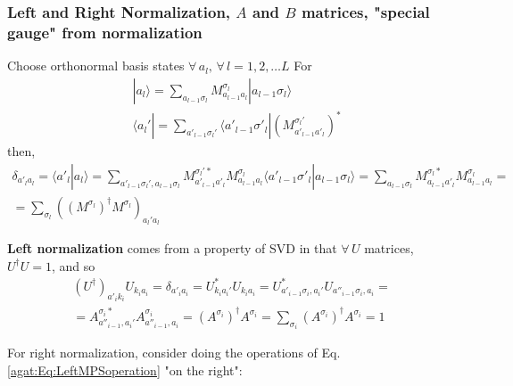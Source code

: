 \subsubsection{Left and Right Normalization, $A$ and $B$ matrices, "special gauge" from normalization}

Choose orthonormal basis states $\forall \, a_l, \, \forall \, l = 1, 2, \dots L$
For
\[
\begin{aligned}
& | a_l \rangle = \sum_{ a_{l-1} \sigma_l } M^{\sigma_l}_{a_{l-1}a_l } | a_{l-1} \sigma_l \rangle \\
& \langle a_l' | = \sum_{a'_{l-1} \sigma_l'} \langle a'_{l-1} \sigma'_l | (M^{\sigma_l'}_{a'_{l-1} a'_l})^*
\end{aligned}
\]
then,
\begin{equation}
\begin{gathered}
\delta_{a'_l a_l} = \langle a'_l | a_l \rangle = \sum_{a'_{l-1}\sigma_l', a_{l-1}\sigma_l } M^{\sigma_l' *}_{a'_{l-1} a'_l} M^{\sigma_l}_{a_{l-1} a_l} \langle a'_{l-1} \sigma'_l | a_{l-1} \sigma_l \rangle = \sum_{a_{l-1} \sigma_l } M^{\sigma_l *}_{a_{l-1} a'_l} M^{\sigma_l}_{a_{l-1} a_l} = \\
= \sum_{\sigma_l} ( (M^{\sigma_l})^{\dag} M^{\sigma_l})_{a_l' a_l}
\end{gathered}
\end{equation}

\textbf{Left normalization} comes from a property of SVD in that $\forall \, U$ matrices, $U^{\dagger} U =1$, and so 
\begin{equation}
\begin{gathered}
(U^{\dagger})_{a'_i k_i} U_{k_i a_i} =  \delta_{a'_i a_i} = U^*_{ k_i a_i'} U_{k_i a_i} = U^*_{a'_{i-1} \sigma_i, a_i'} U_{a''_{i-1}\sigma_i, a_i} = \\ 
= A^{\sigma_i *}_{a''_{i-1}, a_i'} A^{\sigma_i}_{a''_{i-1}, a_i} = (A^{\sigma_i})^{\dagger} A^{\sigma_i} = \boxed{ \sum_{\sigma_i} (A^{\sigma_i})^{\dagger} A^{\sigma_i} = 1 }
\end{gathered}
\end{equation}

For right normalization, consider doing the operations of Eq. \ref{agat:Eq:LeftMPSoperation} "on the right":






